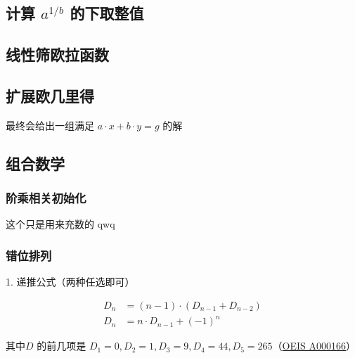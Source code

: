 \documentclass[12pt]{article}
\begin{document}


\newpage

\subsection{计算 $a^{1/b}$ 的下取整值}



\subsection{线性筛欧拉函数}



\newpage

\subsection{扩展欧几里得}

最终会给出一组满足 $a\cdot x+b\cdot y=g$ 的解



\newpage

\subsection{组合数学}

\subsubsection{阶乘相关初始化}

这个只是用来充数的 qwq



\newpage

\subsubsection{错位排列}

1. 递推公式（两种任选即可）

$$
\begin{aligned}
	D_{n}&=(n-1)\cdot(D_{n-1}+D_{n-2})\\
	D_{n}&=n\cdot D_{n-1}+(-1)^{n}
\end{aligned}
$$

其中$D$ 的前几项是 $D_1=0, D_2=1, D_3=9, D_4=44, D_5=265 $（\href{http://oeis.org/A000166}{OEIS A000166}）
\end{document}
